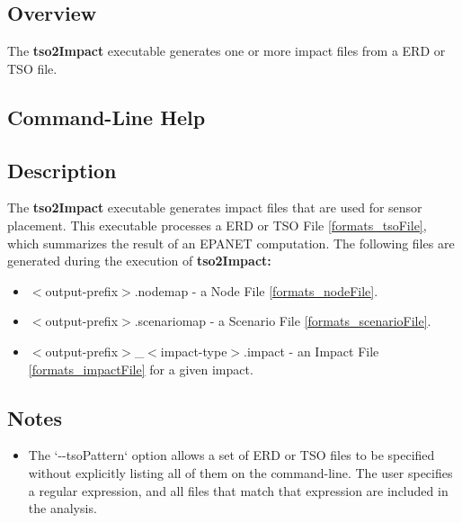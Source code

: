 \subsection{Overview}\label{tso2ImpactExecutable_tso2ImpactOverview}

The {\bfseries tso2Impact} executable generates one or more impact files
from a ERD or TSO file.

\subsection{Command-\/Line Help}\label{tso2ImpactExecutable_tso2ImpactUsage}



\subsection{Description}\label{tso2ImpactExecutable_tso2ImpactDescription}

The {\bfseries tso2Impact} executable generates impact files that are used for 
sensor placement. This executable processes a ERD or TSO File \ref{formats_tsoFile}, 
which summarizes the result of an EPANET computation. The following files are 
generated during the execution of {\bfseries tso2Impact:} 
\begin{itemize}
\item $<$output-\/prefix$>$.nodemap -\/ a Node File \ref{formats_nodeFile}.


\item $<$output-\/prefix$>$.scenariomap -\/ a Scenario File \ref{formats_scenarioFile}.


\item $<$output-\/prefix$>$\_\-$<$impact-\/type$>$.impact -\/ an Impact File 
\ref{formats_impactFile} for a given impact.


\end{itemize}

\subsection{Notes}\label{tso2ImpactExecutable_tso2ImpactNotes}

\begin{itemize}
\item The `-\/-\/tsoPattern` option allows a set of ERD or TSO files to be specified 
without explicitly listing all of them on the command-\/line. The user specifies 
a regular expression, and all files that match that expression are included in 
the analysis. 
\end{itemize}
